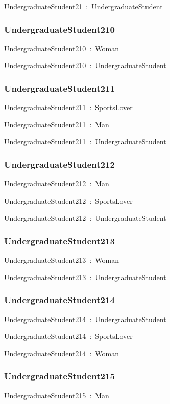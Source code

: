 \documentclass{article}
\begin{document}
UndergraduateStudent21~:~UndergraduateStudent

\subsubsection*{UndergraduateStudent210}

UndergraduateStudent210~:~Woman

UndergraduateStudent210~:~UndergraduateStudent

\subsubsection*{UndergraduateStudent211}

UndergraduateStudent211~:~SportsLover

UndergraduateStudent211~:~Man

UndergraduateStudent211~:~UndergraduateStudent

\subsubsection*{UndergraduateStudent212}

UndergraduateStudent212~:~Man

UndergraduateStudent212~:~SportsLover

UndergraduateStudent212~:~UndergraduateStudent

\subsubsection*{UndergraduateStudent213}

UndergraduateStudent213~:~Woman

UndergraduateStudent213~:~UndergraduateStudent

\subsubsection*{UndergraduateStudent214}

UndergraduateStudent214~:~UndergraduateStudent

UndergraduateStudent214~:~SportsLover

UndergraduateStudent214~:~Woman

\subsubsection*{UndergraduateStudent215}

UndergraduateStudent215~:~Man
\end{document}
